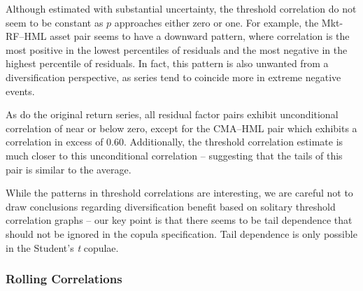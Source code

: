Although estimated with substantial uncertainty, the threshold correlation do not seem to be constant as $p$ approaches either zero or one. For example, the Mkt-RF--HML asset pair seems to have a downward pattern, where correlation is the most positive in the lowest percentiles of residuals and the most negative in the highest percentile of residuals. In fact, this pattern is also unwanted from a diversification perspective, as series tend to coincide more in extreme negative events.

As do the original return series, all residual factor pairs exhibit unconditional correlation of near or below zero, except for the CMA--HML pair which exhibits a correlation in excess of $0.60$. Additionally, the threshold correlation estimate is much closer to this unconditional correlation -- suggesting that the tails of this pair is similar to the average.

While the patterns in threshold correlations are interesting, we are careful not to draw conclusions regarding diversification benefit based on solitary threshold correlation graphs -- our key point is that there seems to be tail dependence that should not be ignored in the copula specification. Tail dependence is only possible in the Student's \textit{t} copulae.

\subsubsection{Rolling Correlations}

